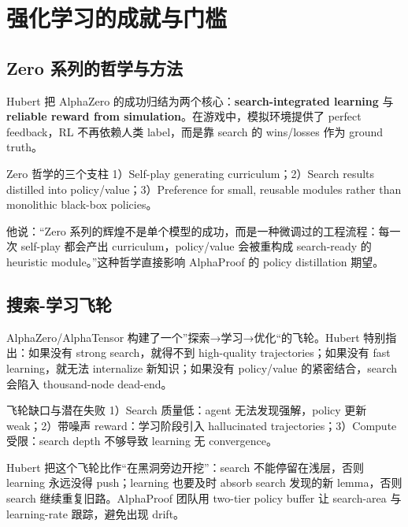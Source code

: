 \section{强化学习的成就与门槛}

\subsection{Zero 系列的哲学与方法}
Hubert 把 AlphaZero 的成功归结为两个核心：\textbf{search-integrated learning} 与 \textbf{reliable reward from simulation}。在游戏中，模拟环境提供了 perfect feedback，RL 不再依赖人类 label，而是靠 search 的 wins/losses 作为 ground truth。
\begin{knowledgebox}{Zero 哲学的三个支柱}
1）Self-play generating curriculum；2）Search results distilled into policy/value；3）Preference for small, reusable modules rather than monolithic black-box policies。
\end{knowledgebox}

他说：“Zero 系列的辉煌不是单个模型的成功，而是一种微调过的工程流程：每一次 self-play 都会产出 curriculum，policy/value 会被重构成 search-ready 的 heuristic module。”这种哲学直接影响 AlphaProof 的 policy distillation 期望。

\subsection{搜索-学习飞轮}
AlphaZero/AlphaTensor 构建了一个”探索→学习→优化“的飞轮。Hubert 特别指出：如果没有 strong search，就得不到 high-quality trajectories；如果没有 fast learning，就无法 internalize 新知识；如果没有 policy/value 的紧密结合，search 会陷入 thousand-node dead-end。
\begin{warningbox}{飞轮缺口与潜在失败}
1）Search 质量低：agent 无法发现强解，policy 更新 weak；2）带噪声 reward：学习阶段引入 hallucinated trajectories；3）Compute 受限：search depth 不够导致 learning 无 convergence。
\end{warningbox}

Hubert 把这个飞轮比作“在黑洞旁边开挖”：search 不能停留在浅层，否则 learning 永远没得 push；learning 也要及时 absorb search 发现的新 lemma，否则 search 继续重复旧路。AlphaProof 团队用 two-tier policy buffer 让 search-area 与 learning-rate 跟踪，避免出现 drift。

